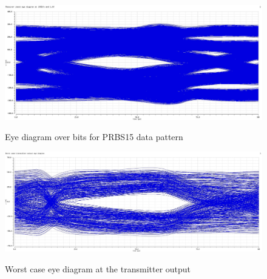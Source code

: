 \begin{figure}[H]
  \centering
  {\includegraphics[scale=0.4]{img/eye_rx_10gbs_5000.jpg}}
  \caption{Eye diagram over \unit[5000]{bits} for PRBS15 data pattern}
  \label{fig:eye_prbs15}
\end{figure}

\begin{figure}[H]
  \centering
  {\includegraphics[scale=0.35]{img/wc_eye_tx.jpg}}
  \caption{Worst case eye diagram at the transmitter output}
  \label{fig:wc_eye}
\end{figure}